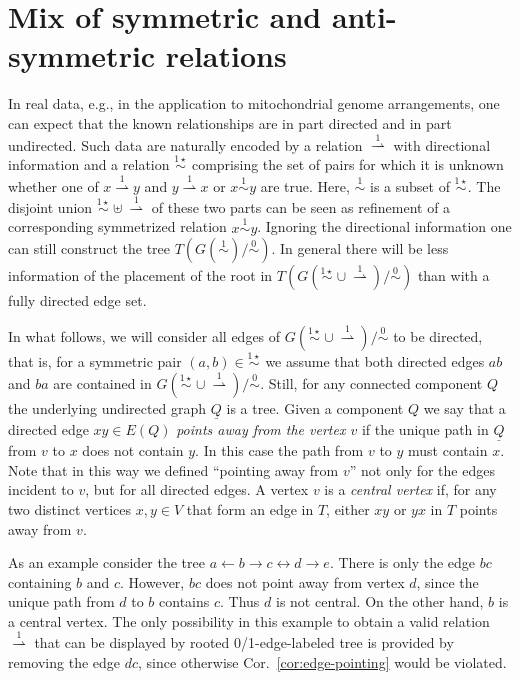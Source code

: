 \documentclass[smallextended]{svjour3}
\newcommand{\rev}[1]{\begingroup\color{blue}#1\endgroup}
\newcommand{\Ro}{\mathrel{\overset{0}{\sim}}}
\newcommand{\Rl}{\mathrel{\overset{1}{\sim}}}
\newcommand{\Rlstar}{\mathrel{\overset{1\star}{\sim}}}
\newcommand{\Rld}{\mathrel{\overset{1}{\rightharpoonup}}}
\begin{document}
\section{Mix of symmetric and anti-symmetric relations}
\label{sect:mixed}

In real data, e.g., in the application to mitochondrial genome
arrangements, one can expect that the known relationships are in part
directed and in part undirected. Such data are naturally encoded by a
relation $\Rld$ with directional information and a relation $\Rlstar$
comprising the set of pairs for which it is unknown whether \rev{ one of $x\Rld y$ and
$y\Rld x$ or $x\Rl y$ are true. Here, $\Rl$ is a subset of $\Rlstar$.}
The
disjoint union $\Rlstar\uplus\Rld$ of these two parts can be seen as
refinement of a corresponding symmetrized relation $x\Rl y$.  Ignoring the
directional information one can still construct the tree $T(G(\Rl)/\Ro)$.
In general there will be less information of the placement of the root in
$T(G(\Rlstar\cup\Rld)/\Ro)$ than with a fully directed edge set. 

\rev{In what follows, we will consider all edges of $G(\Rlstar\cup\Rld)/\Ro$ 
to be directed, that is, for a symmetric pair $(a,b)\in\Rlstar$ we assume that 
both directed edges $ab$ and $ba$ are contained in $G(\Rlstar\cup\Rld)/\Ro$.
Still, for any connected component $Q$ the underlying undirected graph
$\underline{Q}$ is a tree. 
}
Given a component $Q$ we say that a directed edge $xy \in E(Q)$ \emph{points
 away from the vertex $v$} if the unique  path in $\underline{Q}$ from $v$ to $x$ does
not contain $y$. In this case the path from $v$ to $y$ must contain $x$.  Note
that in this way we defined ``pointing away from $v$'' not only for the
edges incident to $v$, but for all directed edges. 
A vertex $v$ is a \emph{central vertex} if, for any two distinct
vertices $x,y\in V$ that form an edge in $T$, either $xy$ or $yx$ in $T$
points away from $v$.

As an example consider the tree $a\leftarrow b\rightarrow c \leftrightarrow
d\rightarrow e$. \rev{ There is only the edge $bc$ containing $b$ and $c$.
However, $bc$ does not point away from vertex $d$, since the unique path
from $d$ to $b$ contains $c$.}  
Thus $d$ is not central. On the other hand, $b$ is a
central vertex. The only possibility in this example to obtain a valid
relation $\Rld$ that can be displayed by rooted 0/1-edge-labeled tree is
provided by removing the edge $dc$, since otherwise Cor.\
\ref{cor:edge-pointing} would be violated.
\end{document}
